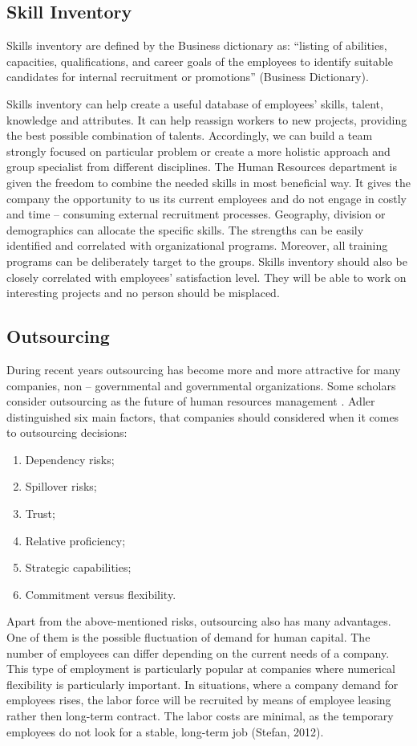 \documentclass[a4paper,fleqn,11pt,dvips,titlepage]{article}
\numberwithin{figure}{section}
\numberwithin{equation}{section}
\begin{document}
\subsection{Skill Inventory}

Skills inventory are defined by the Business dictionary as:
“listing of abilities, capacities, qualifications, and career goals of the employees to identify suitable candidates for internal recruitment or promotions” (Business Dictionary).

Skills inventory can help create a useful database of employees’ skills, talent, knowledge and attributes.
It can help reassign workers to new projects, providing the best possible combination of talents.
Accordingly, we can build a team strongly focused on particular problem or create a more holistic approach and group specialist from different disciplines.
The Human Resources department is given the freedom to combine the needed skills in most beneficial way.
It gives the company the opportunity to us its current employees and do not engage in costly and time – consuming external recruitment processes.
Geography, division or demographics can allocate the specific skills.
The strengths can be easily identified and correlated with organizational programs.
Moreover, all training programs can be deliberately target to the groups.
Skills inventory should also be closely correlated with employees’ satisfaction level.
They will be able to work on interesting projects and no person should be misplaced. 

\subsection{Outsourcing }

During recent years outsourcing has become more and more attractive for many companies, non – governmental and governmental organizations.
Some scholars consider outsourcing as the future of human resources management \cite{adler2003making}.
Adler distinguished six main factors, that companies should considered when it comes to outsourcing decisions:
\begin{enumerate}
  \item Dependency risks;
  \item Spillover risks;
  \item Trust;
  \item Relative proficiency;
  \item Strategic capabilities;
  \item Commitment versus flexibility.
\end{enumerate}
Apart from the above-mentioned risks, outsourcing also has many advantages.
One of them is the possible fluctuation of demand for human capital.
The number of employees can differ depending on the current needs of a company.
This type of employment is particularly popular at companies where numerical flexibility is particularly important.
In situations, where a company demand for employees rises, the labor force will be recruited by means of employee leasing rather then long-term contract.
The labor costs are minimal, as the temporary employees do not look for a stable, long-term job (Stefan, 2012). 
\end{document}
